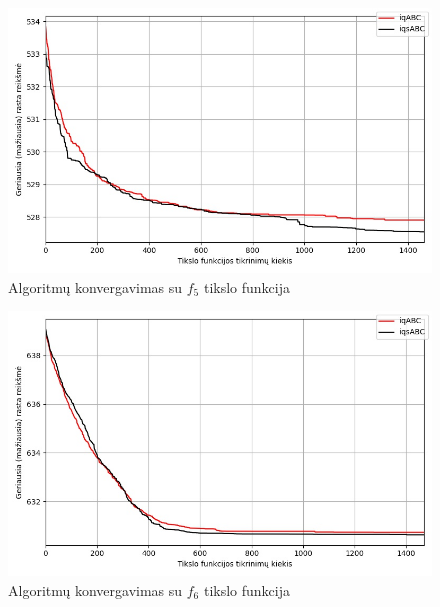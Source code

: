 \documentclass{VUMIFPSmagistrinis}
\begin{document}
\begin{landscape}
\begin{multicols}{2}
\begin{figure}[H]
    \centering
    \includegraphics[scale=0.5]{img/2kg/f5.jpg}
    \caption{Algoritmų konvergavimas su $f_{5}$ tikslo funkcija}
    \label{img:vkonf5}
\end{figure}

\begin{figure}[H]
    \centering
    \includegraphics[scale=0.5]{img/2kg/f6.jpg}
    \caption{Algoritmų konvergavimas su $f_{6}$ tikslo funkcija}
    \label{img:vkonf6}
\end{figure}





\end{multicols}\newpage
\begin{multicols}{2}



\end{multicols}
\end{landscape}
\end{document}
